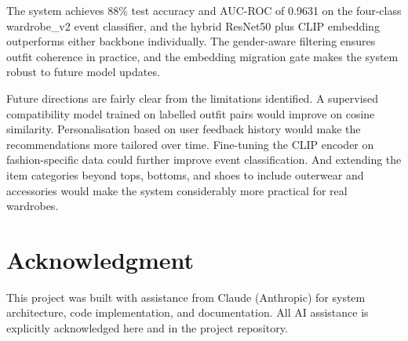\documentclass[conference]{IEEEtran}
\begin{document}
The system achieves 88\% test accuracy and AUC-ROC of 0.9631 on the four-class wardrobe\_v2 event classifier, and the hybrid ResNet50 plus CLIP embedding outperforms either backbone individually. The gender-aware filtering ensures outfit coherence in practice, and the embedding migration gate makes the system robust to future model updates.

Future directions are fairly clear from the limitations identified. A supervised compatibility model trained on labelled outfit pairs would improve on cosine similarity. Personalisation based on user feedback history would make the recommendations more tailored over time. Fine-tuning the CLIP encoder on fashion-specific data could further improve event classification. And extending the item categories beyond tops, bottoms, and shoes to include outerwear and accessories would make the system considerably more practical for real wardrobes.

\section*{Acknowledgment}

This project was built with assistance from Claude (Anthropic) for system architecture, code implementation, and documentation. All AI assistance is explicitly acknowledged here and in the project repository.
\end{document}
